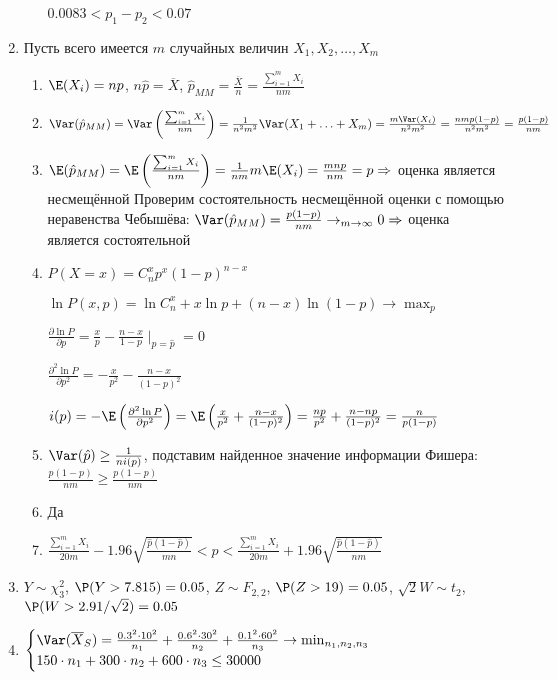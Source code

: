 \begin{enumerate}
\begin{enumerate}
$0.0083 < p_1 - p_2 < 0.07$
\end{enumerate}

\item Пусть всего имеется $m$ случайных величин $X_1, X_2, \ldots , X_m $
\begin{enumerate}
\item $\E(X_i) = np$, $n\hat{p} = \overline{X}$, $\hat{p}_{MM} = \frac{\overline{X}}{n} = \frac{\sum_{i=1}^m X_i}{nm}$
\item $\Var(\hat{p}_{MM}) = \Var\left(\frac{\sum_{i=1}^m X_i}{nm}\right) = \frac{1}{n^2m^2} \Var(X_1 + \ldots + X_m) = \frac{m \Var(X_i)}{n^2m^2} = \frac{nmp(1-p)}{n^2m^2} = \frac{p(1-p)}{nm}$
\item $\E(\hat{p}_{MM}) = \E\left(\frac{\sum_{i=1}^m X_i}{nm}\right) = \frac{1}{nm}m\E(X_i) = \frac{mnp}{nm} = p \Rightarrow$ оценка является несмещённой
Проверим состоятельность несмещённой оценки с помощью неравенства Чебышёва:
$\Var(\hat{p}_{MM}) = \frac{p(1-p)}{nm} \to_{m\to\infty} 0 \Rightarrow$ оценка является состоятельной
\item $P(X=x) = C^x_n p^x (1-p)^{n-x}$

$\ln P(x, p) = \ln C^x_n + x\ln p + (n-x) \ln (1-p) \to \max_p$

$\frac{\partial \ln P}{\partial p} = \frac{x}{p} - \frac{n-x}{1-p} \mid_{p=\hat{p}} = 0$

$\frac{\partial^2 \ln P}{\partial p^2} = -\frac{x}{p^2} - \frac{n-x}{(1-p)^2}$

$i(p) = -\E\left(\frac{\partial^2 \ln P}{\partial p^2}\right) = \E\left(\frac{x}{p^2} + \frac{n-x}{(1-p)^2}\right) = \frac{np}{p^2} + \frac{n-np}{(1-p)^2} = \frac{n}{p(1-p)}$

\item $\Var(\hat{p}) \geq \frac{1}{ni(p)}$, подставим найденное значение информации Фишера: $\frac{p(1-p)}{nm} \geq \frac{p(1-p)}{nm}$

\item Да

\item $\frac{\sum_{i=1}^m X_i}{20m} - 1.96 \sqrt{\frac{\hat{p}(1-\hat{p})}{mn}}  < p < \frac{\sum_{i=1}^m X_i}{20m} + 1.96 \sqrt{\frac{\hat{p}(1-\hat{p})}{nm}} $
\end{enumerate}

\item $Y \sim \chi^2_3$, $\P(Y>7.815)=0.05$, $Z \sim F_{2,2}$, $\P(Z>19)=0.05$, $\sqrt{2}W \sim t_{2}$, $\P(W > 2.91/\sqrt{2})=0.05$

\item
$
\begin{cases}
\Var(\overline{X}_S) = \frac{0.3^2\cdot 10^2}{n_1} + \frac{0.6^2 \cdot 30^2}{n_2} + \frac{0.1^2 \cdot 60^2}{n_3} \to \min_{n_1, n_2, n_3} \\
150\cdot n_1 + 300 \cdot n_2 + 600 \cdot n_3 \leq 30000
\end{cases}
$


\end{enumerate}
